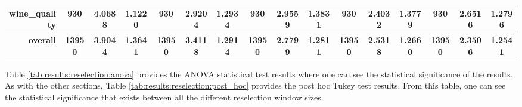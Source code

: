 \begin{table}[htbp]
{\begin{tabular}{rccccccccccccccc}
			wine\_quality                       & 930                                      & 4.0688                                                                    & 1.1220          & 930                            & 2.9204          & 1.2934          & 930                             & 2.9559          & 1.3831          & 930                             & \cellcolor[rgb]{ .776,  .937,  .808}\textcolor[rgb]{ 0,  .38,  0}{2.4032} & 1.3779          & 930                             & 2.6516                                                                             & 1.2796          \\
			\midrule
			\textbf{overall}                    & \textbf{13950}                           & \textbf{3.9044}                                                           & \textbf{1.3641} & \textbf{13950}                 & \textbf{3.4118} & \textbf{1.2914} & \textbf{13950}                  & \textbf{2.7799} & \textbf{1.2811} & \textbf{13950}                  & \textbf{2.5318}                                                           & \textbf{1.2660} & \textbf{13950}                  & \cellcolor[rgb]{ .776,  .937,  .808}\textcolor[rgb]{ 0,  .38,  0}{\textbf{2.3506}} & \textbf{1.2541} \\
		\end{tabular}%
	}
\end{table}%

Table \ref{tab:results:reselection:anova} provides the ANOVA statistical test results where one can see the statistical significance of the results. As with the other sections, Table \ref{tab:results:reselection:post_hoc} provides the post hoc Tukey test results. From this table, one can see the statistical significance that exists between all the different reselection window sizes.

\begin{table}[htbp]
	\centering
	\caption{ANOVA - Rank - BHH Variant: Reselection}
	\label{tab:results:reselection:anova}%
	\par\bigskip
\end{table}

